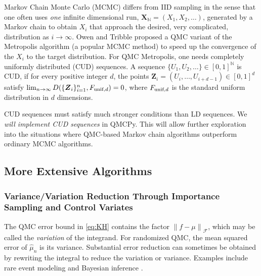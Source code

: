 \documentclass[11pt]{NSFamsart}
\newcommand{\unif}{\textup{unif}}
\newcommand{\naturals}{{\mathbb{N}}}
\newcommand{\bX}{{\boldsymbol{X}}}
\newcommand{\bZ}{{\boldsymbol{Z}}}
\newcommand{\calf}{{\mathcal{F}}}
\newcommand{\norm}[2][{}]{\ensuremath{\left \lVert #2 \right \rVert}_{#1}}
\newcommand{\hmu}{\hat{\mu}}
\begin{document}
Markov Chain Monte Carlo (MCMC) differs from IID sampling in the sense that one often uses \emph{one} infinite dimensional run, $\bX_{\naturals} = (X_1, X_2, \dots)$, generated by a Markov chain to obtain $X_i$ that approach the desired, very complicated, distribution as $i \to \infty$.  Owen and Tribble \cite{OweTri05a} proposed a QMC variant of the Metropolis algorithm (a popular MCMC method) to speed up the convergence of the $X_i$ to the target distribution.  For QMC Metropolis, one needs completely uniformly distributed (CUD) sequences.  A sequence $\{U_1, U_2, \ldots \} \in [0, 1]^{\naturals}$  is CUD, if for every positive integer $d$, the points $\bZ_i = (U_{i}, \ldots, U_{i+d-1}) \in [0, 1]^d$ satisfy $\lim_{n \to \infty} D(\{ \bZ_i\}_{i=1}^n,F_{\unif,d}) = 0$, where $F_{\unif,d}$  is the standard uniform distribution in $d$ dimensions.

CUD sequences must satisfy much stronger conditions than LD sequences.  We \emph{will implement CUD sequences} in QMCPy.  This will allow further exploration into the situations where QMC-based Markov chain algorithms outperform ordinary MCMC algorithms.


\subsection{More Extensive Algorithms}


\subsubsection{Variance/Variation Reduction Through Importance Sampling and Control Variates}
The QMC error bound in \eqref{eq:KH} contains the factor $\norm[\calf]{f - \mu}$, which may be called the \emph{variation} of the integrand.  For randomized QMC, the mean squared error of $\hmu_n$ is its variance.  Substantial error reduction can sometimes be obtained by rewriting the integral to reduce the variation or variance.  Examples include rare event modeling \cite{rubino2009rare} and Bayesian inference \cite{salmeron2000importance}.
\end{document}

